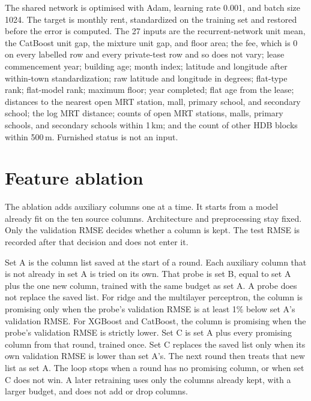 \documentclass[11pt,a4paper]{article}
\begin{document}
The shared network is optimised with Adam, learning rate 0.001, and batch size 1024.
The target is monthly rent, standardized on the training set and restored before the error is computed.
The 27 inputs are the recurrent-network unit mean, the CatBoost unit gap, the mixture unit gap, and floor area; the fee, which is 0 on every labelled row and every private-test row and so does not vary; lease commencement year; building age; month index; latitude and longitude after within-town standardization; raw latitude and longitude in degrees; flat-type rank; flat-model rank; maximum floor; year completed; flat age from the lease; distances to the nearest open MRT station, mall, primary school, and secondary school; the log MRT distance; counts of open MRT stations, malls, primary schools, and secondary schools within 1\,km; and the count of other HDB blocks within 500\,m.
Furnished status is not an input.

\section{Feature ablation}
\label{app:ablation}

The ablation adds auxiliary columns one at a time.
It starts from a model already fit on the ten source columns.
Architecture and preprocessing stay fixed.
Only the validation RMSE decides whether a column is kept.
The test RMSE is recorded after that decision and does not enter it.

Set A is the column list saved at the start of a round.
Each auxiliary column that is not already in set A is tried on its own.
That probe is set B, equal to set A plus the one new column, trained with the same budget as set A.
A probe does not replace the saved list.
For ridge and the multilayer perceptron, the column is promising only when the probe's validation RMSE is at least 1\% below set A's validation RMSE.
For XGBoost and CatBoost, the column is promising when the probe's validation RMSE is strictly lower.
Set C is set A plus every promising column from that round, trained once.
Set C replaces the saved list only when its own validation RMSE is lower than set A's.
The next round then treats that new list as set A.
The loop stops when a round has no promising column, or when set C does not win.
A later retraining uses only the columns already kept, with a larger budget, and does not add or drop columns.
\end{document}
